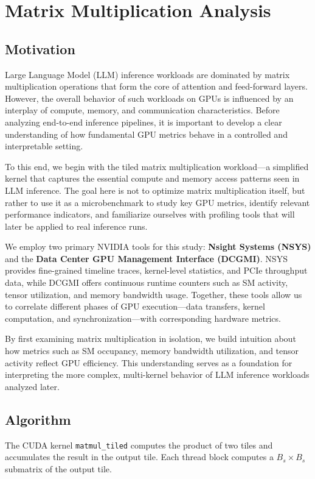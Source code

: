 \chapter{Matrix Multiplication Analysis}
\label{ch:matrix_multiplication}
\section{Motivation}

Large Language Model (LLM) inference workloads are dominated by matrix multiplication operations that form the core of attention and feed-forward layers. However, the overall behavior of such workloads on GPUs is influenced by an interplay of compute, memory, and communication characteristics. Before analyzing end-to-end inference pipelines, it is important to develop a clear understanding of how fundamental GPU metrics behave in a controlled and interpretable setting.

To this end, we begin with the tiled matrix multiplication workload—a simplified kernel that captures the essential compute and memory access patterns seen in LLM inference. The goal here is not to optimize matrix multiplication itself, but rather to use it as a microbenchmark to study key GPU metrics, identify relevant performance indicators, and familiarize ourselves with profiling tools that will later be applied to real inference runs.

We employ two primary NVIDIA tools for this study: \textbf{Nsight Systems (NSYS)} and the \textbf{Data Center GPU Management Interface (DCGMI)}. NSYS provides fine-grained timeline traces, kernel-level statistics, and PCIe throughput data, while DCGMI offers continuous runtime counters such as SM activity, tensor utilization, and memory bandwidth usage. Together, these tools allow us to correlate different phases of GPU execution—data transfers, kernel computation, and synchronization—with corresponding hardware metrics.

By first examining matrix multiplication in isolation, we build intuition about how metrics such as SM occupancy, memory bandwidth utilization, and tensor activity reflect GPU efficiency. This understanding serves as a foundation for interpreting the more complex, multi-kernel behavior of LLM inference workloads analyzed later.

\section{Algorithm}
The CUDA kernel \texttt{matmul\_tiled} computes the product of two tiles and accumulates the result in the output tile. Each thread block computes a $B_s \times B_s$ submatrix of the output tile.

